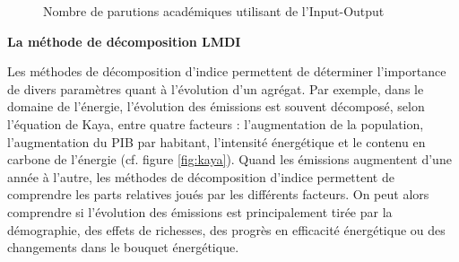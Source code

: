 \begin{figure}[!h]
	\centering
	 \qquad
	\caption{Nombre de parutions académiques utilisant de l'Input-Output}
\end{figure}


\vspace{1em}
\textbf{La méthode de décomposition LMDI}

Les méthodes de décomposition d'indice permettent de déterminer l'importance de divers paramètres quant à l'évolution d'un agrégat. Par exemple, dans le domaine de l'énergie, l'évolution des émissions est souvent décomposé, selon l'équation de Kaya, entre quatre facteurs : l'augmentation de la population, l'augmentation du PIB par habitant, l'intensité énergétique et le contenu en carbone de l'énergie (cf. figure \ref{fig:kaya}). Quand les émissions augmentent d'une année à l'autre, les méthodes de décomposition d'indice permettent de comprendre les parts relatives joués par les différents facteurs. On peut alors comprendre si l'évolution des émissions est principalement tirée par la démographie, des effets de richesses, des progrès en efficacité énergétique ou des changements dans le bouquet énergétique.


